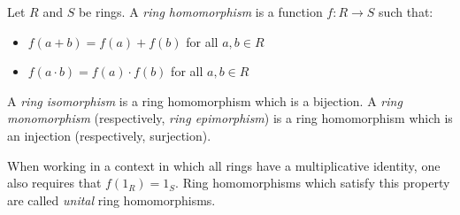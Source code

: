 \documentclass[12pt]{article}
\begin{document}
Let $R$ and $S$ be rings. A \emph{ring homomorphism} is a function $f: R \longrightarrow S$ such that:
\begin{itemize}
\item $f(a+b) = f(a)+f(b)$ for all $a,b \in R$
\item $f(a\cdot b) = f(a) \cdot f(b)$ for all $a,b \in R$
\end{itemize}

A \emph{ring isomorphism} is a ring homomorphism which is a bijection. A \emph{ring monomorphism} (respectively, \emph{ring epimorphism}) is a ring homomorphism which is an injection (respectively, surjection).

When working in a context in which all rings have a multiplicative identity, one also requires that $f(1_R) = 1_S$. Ring homomorphisms which satisfy this property are called \emph{unital} ring homomorphisms.
\end{document}
